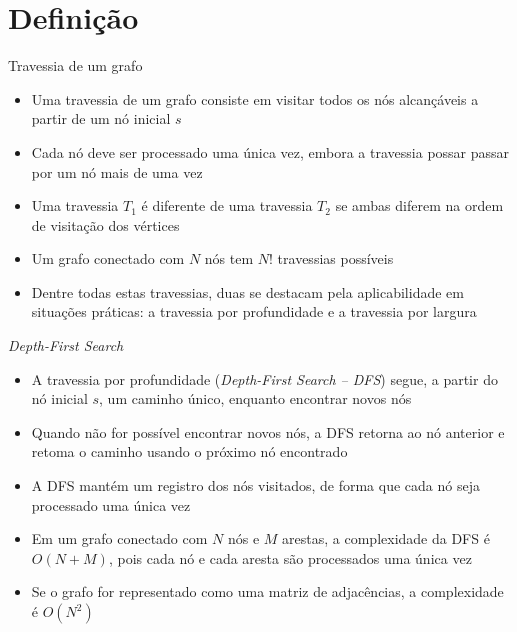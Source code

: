 \section{Definição}

\begin{frame}[fragile]{Travessia de um grafo}

    \begin{itemize}
        \item Uma travessia de um grafo consiste em visitar todos os nós alcançáveis a partir
            de um nó inicial $s$

        \item Cada nó deve ser processado uma única vez, embora a travessia possar passar por um
            nó mais de uma vez

        \item Uma travessia $T_1$ é diferente de uma travessia $T_2$ se ambas diferem na ordem de
            visitação dos vértices

        \item Um grafo conectado com $N$ nós tem $N!$ travessias possíveis

        \item Dentre todas estas travessias, duas se destacam pela aplicabilidade em situações
            práticas: a travessia por profundidade e a travessia por largura
    \end{itemize}

\end{frame}

\begin{frame}[fragile]{\textit{Depth-First Search}}

    \begin{itemize}
        \item A travessia por profundidade (\textit{Depth-First Search -- DFS}) segue, a partir
            do nó inicial $s$, um caminho único, enquanto encontrar novos nós

        \item Quando não for possível encontrar novos nós, a DFS retorna ao nó anterior e 
            retoma o caminho usando o próximo nó encontrado

        \item A DFS mantém um registro dos nós visitados, de forma que cada nó seja processado
            uma única vez

        \item Em um grafo conectado com $N$ nós e $M$ arestas, a complexidade da DFS é
            $O(N + M)$, pois cada nó e cada aresta são processados uma única vez

        \item Se o grafo for representado como uma matriz de adjacências, a complexidade é 
            $O(N^2)$

    \end{itemize}

\end{frame}

